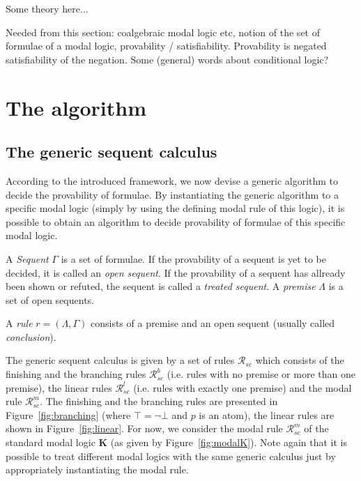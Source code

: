 \documentclass{entcs} \usepackage{entcsmacro}
\begin{document}
Some theory here...

Needed from this section: coalgebraic modal logic etc, notion of the set of
formulae of a modal logic, provability / satisfiability. Provability is
negated satisfiability of the negation.
Some (general) words about conditional logic?

\section{The algorithm}

\subsection{The generic sequent calculus}

According to the introduced framework, we now devise a generic
algorithm to decide the provability of formulae. By
instantiating the generic algorithm to a specific modal logic
(simply by using the defining modal rule of this logic), it is
possible to obtain an algorithm to decide provability of
formulae of this specific modal logic.

\begin{definition}
A \emph{Sequent} $\Gamma$ is a set of formulae. If the provability
of a sequent is yet to be decided, it is called an \emph{open sequent}.
If the provability of a sequent has allready been shown or refuted,
the sequent is called a \emph{treated sequent}. A \emph{premise}
$\Lambda$ is a set of open sequents.
\end{definition}

\begin{definition}
\noindent A \emph{rule} $r=(\Lambda,\Gamma)$ consists of a premise
and an open sequent (usually called \emph{conclusion}).
\end{definition}
\noindent The generic sequent calculus is given by a set of rules
$\mathcal{R}_{sc}$ which consists of the finishing and the branching
rules $\mathcal{R}^b_{sc}$ (i.e. rules with no premise or more than
one premise), the linear rules $\mathcal{R}^l_{sc}$ (i.e. rules with
exactly one premise) and the modal rule $\mathcal R^m_{sc}$. The
finishing and the branching rules are presented in Figure~\ref{fig:branching}
(where $\top=\neg\bot$ and $p$ is an atom), the
linear rules are shown in Figure~\ref{fig:linear}. For now, we consider the modal
rule $\mathcal R^m_{sc}$ of the standard modal logic \textbf{K}
(as given by Figure~\ref{fig:modalK}). Note again that
it is possible to treat different modal logics with the same generic
calculus just by appropriately instantiating the modal rule.
\end{document}
